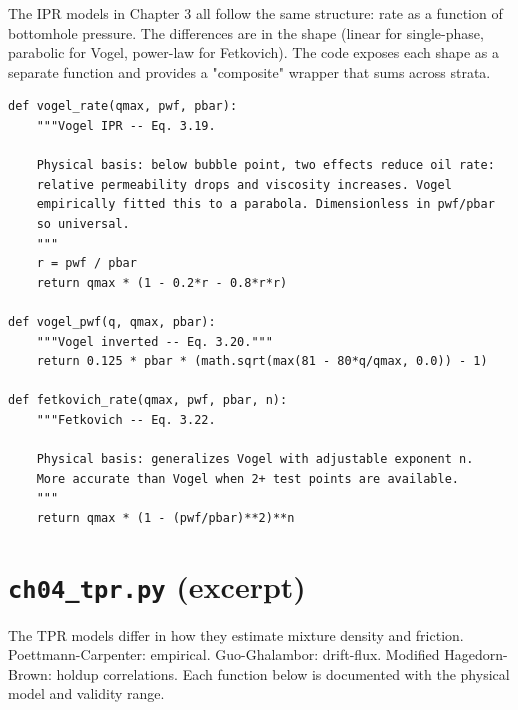 \documentclass[11pt,a4paper,openany]{book}
\newcommand{\code}[1]{\texttt{#1}}
\begin{document}
\begin{theory}
The IPR models in Chapter 3 all follow the same structure: rate as a
function of bottomhole pressure. The differences are in the shape
(linear for single-phase, parabolic for Vogel, power-law for
Fetkovich). The code exposes each shape as a separate function and
provides a "composite" wrapper that sums across strata.
\end{theory}

\begin{lstlisting}
def vogel_rate(qmax, pwf, pbar):
    """Vogel IPR -- Eq. 3.19.

    Physical basis: below bubble point, two effects reduce oil rate:
    relative permeability drops and viscosity increases. Vogel
    empirically fitted this to a parabola. Dimensionless in pwf/pbar
    so universal.
    """
    r = pwf / pbar
    return qmax * (1 - 0.2*r - 0.8*r*r)

def vogel_pwf(q, qmax, pbar):
    """Vogel inverted -- Eq. 3.20."""
    return 0.125 * pbar * (math.sqrt(max(81 - 80*q/qmax, 0.0)) - 1)

def fetkovich_rate(qmax, pwf, pbar, n):
    """Fetkovich -- Eq. 3.22.

    Physical basis: generalizes Vogel with adjustable exponent n.
    More accurate than Vogel when 2+ test points are available.
    """
    return qmax * (1 - (pwf/pbar)**2)**n
\end{lstlisting}

\section{\code{ch04\_tpr.py} (excerpt)}

\begin{theory}
The TPR models differ in how they estimate mixture density and
friction. Poettmann-Carpenter: empirical. Guo-Ghalambor: drift-flux.
Modified Hagedorn-Brown: holdup correlations. Each function below
is documented with the physical model and validity range.
\end{theory}
\end{document}
